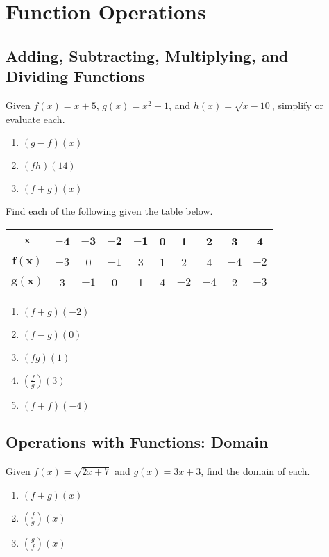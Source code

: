 \chapter{Function Operations}

\section{Adding, Subtracting, Multiplying, and Dividing Functions}

Given $f(x) = x + 5$, $g(x) = x^2 - 1$, and $h(x) = \sqrt{x-10}$, simplify or evaluate each.
\begin{enumerate}
    \item $(g-f)(x)$
    \item $(fh)(14)$
    \item $(f+g)(x)$
\setcounter{Review}{\value{enumi}}
\end{enumerate}

Find each of the following given the table below.
\begin{center}
\begin{tabular}{c|c|c|c|c|c|c|c|c|c}
    $\bm{x}$ & $\bm{-4}$ & $\bm{-3}$ & $\bm{-2}$ & $\bm{-1}$ & \textbf{0} & \textbf{1} & \textbf{2} & \textbf{3} & \textbf{4} \\ \hline
    $\bm{f(x)}$ & $-3$ & 0 & $-1$ & 3 & 1 & 2 & 4 & $-4$ & $-2$ \\ \hline
    $\bm{g(x)}$ & 3 & $-1$ & 0 & 1 & 4 & $-2$ & $-4$ & 2 & $-3$ \\
\end{tabular}
\end{center}

\begin{multicols}{5}
\begin{enumerate}	\setcounter{enumi}{\value{Review}}
	\item $(f + g)(-2)$
	\item $(f - g)(0)$
	\item $(fg)(1)$
	\item $\left(\frac{f}{g}\right)(3)$
	\item $(f + f)(-4)$
\setcounter{Review}{\value{enumi}}
\end{enumerate}
\end{multicols}

\section{Operations with Functions: Domain}

Given $f(x)=\sqrt{2x+7}$ and $g(x) = 3x+3$, find the domain of each.
\begin{enumerate}
\item $(f + g)(x)$
\item $\left(\frac{f}{g}\right)(x)$
\item $\left(\frac{g}{f}\right)(x)$
\end{enumerate}


